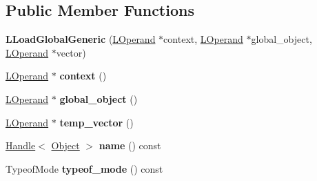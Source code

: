 \subsection*{Public Member Functions}
\begin{DoxyCompactItemize}
\item 
{\bfseries L\+Load\+Global\+Generic} (\hyperlink{classv8_1_1internal_1_1_l_operand}{L\+Operand} $\ast$context, \hyperlink{classv8_1_1internal_1_1_l_operand}{L\+Operand} $\ast$global\+\_\+object, \hyperlink{classv8_1_1internal_1_1_l_operand}{L\+Operand} $\ast$vector)\hypertarget{classv8_1_1internal_1_1_l_load_global_generic_a5992cad6cdc59da767d3d35fdbf4c4f7}{}\label{classv8_1_1internal_1_1_l_load_global_generic_a5992cad6cdc59da767d3d35fdbf4c4f7}

\item 
\hyperlink{classv8_1_1internal_1_1_l_operand}{L\+Operand} $\ast$ {\bfseries context} ()\hypertarget{classv8_1_1internal_1_1_l_load_global_generic_acb9446dcc83f4319988b01ff0d957bf6}{}\label{classv8_1_1internal_1_1_l_load_global_generic_acb9446dcc83f4319988b01ff0d957bf6}

\item 
\hyperlink{classv8_1_1internal_1_1_l_operand}{L\+Operand} $\ast$ {\bfseries global\+\_\+object} ()\hypertarget{classv8_1_1internal_1_1_l_load_global_generic_a43bc76ffc93765b0231ba74a702acb19}{}\label{classv8_1_1internal_1_1_l_load_global_generic_a43bc76ffc93765b0231ba74a702acb19}

\item 
\hyperlink{classv8_1_1internal_1_1_l_operand}{L\+Operand} $\ast$ {\bfseries temp\+\_\+vector} ()\hypertarget{classv8_1_1internal_1_1_l_load_global_generic_a6e6428d159408fa7d9a31d38cc08919c}{}\label{classv8_1_1internal_1_1_l_load_global_generic_a6e6428d159408fa7d9a31d38cc08919c}

\item 
\hyperlink{classv8_1_1internal_1_1_handle}{Handle}$<$ \hyperlink{classv8_1_1internal_1_1_object}{Object} $>$ {\bfseries name} () const \hypertarget{classv8_1_1internal_1_1_l_load_global_generic_a8986cdf04702fb63aee12526199431ab}{}\label{classv8_1_1internal_1_1_l_load_global_generic_a8986cdf04702fb63aee12526199431ab}

\item 
Typeof\+Mode {\bfseries typeof\+\_\+mode} () const \hypertarget{classv8_1_1internal_1_1_l_load_global_generic_a92314902b26af0eba30f17b3c9e9d768}{}\label{classv8_1_1internal_1_1_l_load_global_generic_a92314902b26af0eba30f17b3c9e9d768}


\end{DoxyCompactItemize}
